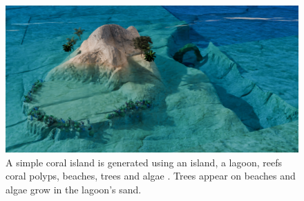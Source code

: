 \begin{figure}
    \includegraphics{Figures/CoralIsland/multiScene1 v2 final 1.png}
    \caption{A simple coral island is generated using an island, a lagoon, reefs coral polyps, beaches, trees and algae . Trees appear on beaches and algae grow in the lagoon's sand. }
    \label{fig:semantic-representation_coral-island-scene}
\end{figure}





































